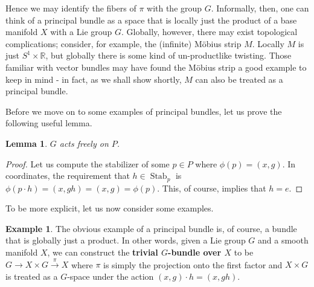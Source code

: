 \documentclass{book}
\newcommand{\R}{\mathbb{R}}
\DeclareMathOperator{\Stab}{Stab}
\theoremstyle{plain}
\newtheorem{lem}[thm]{Lemma}
\theoremstyle{definition}
\newtheorem{exmp}{Example}
\theoremstyle{remark}
\begin{document}
Hence we may identify the fibers of $\pi$ with the group $G$.
Informally, then, one can think of a principal bundle as a space that is locally just the product of a base manifold $X$ with a Lie group $G$.
Globally, however, there may exist topological complications; consider, for example, the (infinite) M\"obius strip $M$.
Locally $M$ is just $S^1\times \R$, but globally there is some kind of un-productlike twisting. Those familiar with vector bundles
may have found the M\"obius strip a good example to keep in mind - in fact, as we shall show shortly, $M$ can also be
treated as a principal bundle. 

Before we move on to some examples of principal bundles, let us prove the following useful lemma.

\begin{lem}
    $G$ acts freely on $P$.
\end{lem}
\begin{proof}
    Let us compute the stabilizer of some $p\in P$ where $\phi(p)=(x,g)$.
    In coordinates, the requirement that $h\in\Stab_p$ is
    $\phi(p\cdot h)=(x,gh)=(x,g)=\phi(p).$
    This, of course, implies that $h=e$.
\end{proof}

To be more explicit, let us now consider some examples.

\begin{exmp}
    The obvious example of a principal bundle is, of course, a bundle that is globally just a product. In other words, given
    a Lie group $G$ and a smooth manifold $X$, we can construct the \textbf{trivial $G$-bundle over $X$} to be
    $G\to X\times G\overset{\pi}{\to} X$ where $\pi$ is simply the projection onto the first factor and $X\times G$ is treated as
    a $G$-space under the action $(x,g)\cdot h=(x,gh)$.
\end{exmp}
\end{document}
